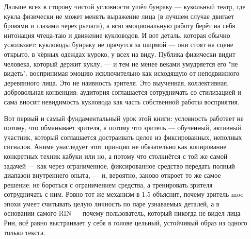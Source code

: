 Дальше всех в сторону чистой условности ушёл бунраку — кукольный театр, где кукла физически не может менять выражение лица (в лучшем случае двигает бровями и глазами через рычаги), а всю эмоциональную работу берёт на себя интонация чтеца-таю и движение кукловодов. И вот деталь, которая обычно ускользает: кукловоды бунраку не прячутся за ширмой — они стоят на сцене открыто, в чёрных одеждах куроко, у всех на виду. Публика физически видит человека, который держит куклу, — и тем не менее веками умудряется его "не видеть", воспринимая эмоцию исключительно как исходящую от неподвижного деревянного лица. Это не наивность зрителя. Это выученная, коллективная, добровольная конвенция: аудитория соглашается сотрудничать со стилизацией и сама вносит невидимость кукловода как часть собственной работы восприятия.

Вот первый и самый фундаментальный урок этой книги: условность работает не потому, что обманывает зрителя, а потому что зритель — обученный, активный участник, который соглашается достраивать целое из фиксированных, неполных сигналов. Аниме унаследует этот принцип не обязательно как копирование конкретных техник кабуки или но, а потому что столкнётся с той же самой задачей — как через ограниченное, фиксированное средство передать полный диапазон внутреннего опыта, — и, вероятно, заново откроет то же самое решение: не бороться с ограничением средства, а тренировать зрителя сотрудничать с ним. Ровно тот же механизм в 1.5 объяснит, почему зритель moe-эпохи умеет считывать целую личность по паре узнаваемых деталей, а в основании самого RIN — почему пользователь, который никогда не видел лица Рин, всё равно выстраивает у себя в голове цельный, устойчивый образ из одного только текста.

